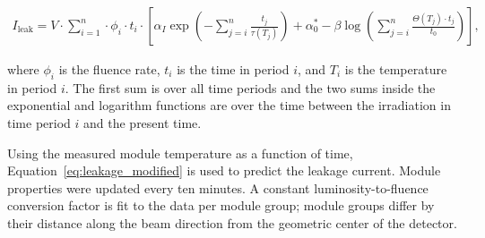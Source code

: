 \begin{align}
\label{eq:leakage_modified}
I_\text{leak}=V\cdot\sum_{i=1}^n\cdot\phi_i\cdot t_i\cdot\left[\alpha_I\exp\left(-\sum_{j=i}^n\frac{t_j}{\tau(T_j)}\right)+\alpha_0^*-\beta\log\left(\sum_{j=i}^n\frac{\Theta(T_j)\cdot t_j }{ t_0}\right)\right],
\end{align}

where $\phi_i$ is the fluence rate, $t_i$ is the time in period $i$, and $T_i$ is the temperature in period $i$.  The first sum is over all time periods and the two sums inside the exponential and logarithm functions are over the time between the irradiation in time period $i$ and the present time.

Using the measured module temperature as a function of time, Equation~\ref{eq:leakage_modified} is used to predict the leakage current. 
Module properties were updated every ten minutes.    A constant luminosity-to-fluence conversion factor is fit to the data per module group;  module groups differ by their distance along the beam direction from the geometric center of the detector.  


